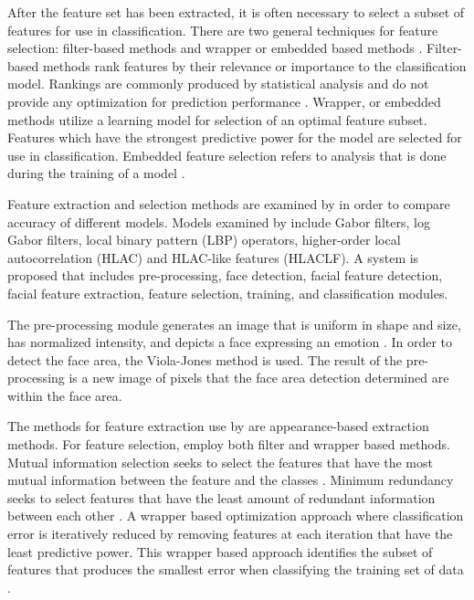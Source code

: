 After the feature set has been extracted, it is often necessary to select a subset of features for use in classification. There are two general techniques for feature selection: filter-based methods and wrapper or embedded based methods \cite{guyon2008feature}. Filter-based methods rank features by their relevance or importance to the classification model. Rankings are commonly produced by statistical analysis and do not provide any optimization for prediction performance \cite{guyon2008feature}. Wrapper, or embedded methods utilize a learning model for selection of an optimal feature subset. Features which have the strongest predictive power for the model are selected for use in classification. Embedded feature selection refers to analysis that is done during the training of a model \cite{guyon2008feature}.


Feature extraction and selection methods are examined by \cite{lajevardi2012automatic} in order to compare accuracy of different models. Models examined by \cite{lajevardi2012automatic} include Gabor filters, log Gabor filters, local binary pattern (LBP) operators, higher-order local autocorrelation (HLAC) and HLAC-like features (HLACLF). A system is proposed that includes pre-processing, face detection, facial feature detection, facial feature extraction, feature selection, training, and classification modules.  

The pre-processing module generates an image that is uniform in shape and size, has normalized intensity, and depicts a face expressing an emotion \cite{lajevardi2012automatic}. In order to detect the face area, the Viola-Jones method \cite{viola2004robust} is used. The result of the pre-processing is a new image of pixels that the face area detection determined are within the face area.

The methods for feature extraction use by \cite{lajevardi2012automatic} are appearance-based extraction methods. For feature selection, \cite{lajevardi2012automatic} employ both filter and wrapper based methods.
Mutual information selection seeks to select the features that have the most mutual information between the feature and the classes \cite{lajevardi2012automatic}.
Minimum redundancy seeks to select features that have the least amount of redundant information between each other \cite{lajevardi2012automatic}.
A wrapper based optimization approach where classification error is iteratively reduced by removing features at each iteration that have the least predictive power. This wrapper based approach identifies the subset of features that produces the smallest error when classifying the training set of data \cite{lajevardi2012automatic}.

